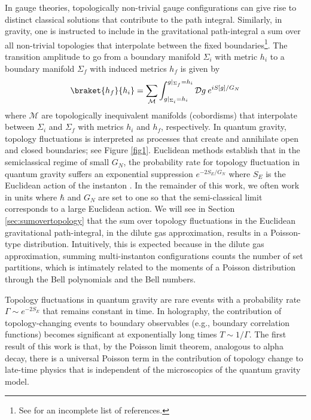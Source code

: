 \documentclass[a4paper,11pt]{article}
\theoremstyle{definition}
\numberwithin{equation}{section}
\newcommand{\NL}[1]{\textcolor{blue}{#1}}
\newcommand{\mM}{\mathcal{M}}
\begin{document}

In gauge theories, topologically non-trivial gauge configurations can give rise to distinct classical solutions that contribute to the path integral. 
Similarly, in gravity, one is instructed to include in the gravitational path-integral a sum over all non-trivial topologies that interpolate between the fixed boundaries\footnote{See \cite{hawking1980quantum,hawking1982unpredictability,hartle1983wave,strominger1984vacuum,hawking1987quantum,hawking1988wormholes} for an incomplete list of references.}. The transition amplitude to go from a boundary manifold $\Sigma_i$ with metric $h_i$ to a boundary manifold $\Sigma_f$ with induced metrics $h_f$ is given by 
\begin{eqnarray}
    \braket{h_f}{h_i}=\sum_{\mathcal{M}}\int_{g|_{\Sigma_i}=h_i}^{g|_{\Sigma_f}=h_i} \mathcal{D}g\:e^{i S[g]/G_N}
\end{eqnarray}
where $\mM$ are topologically inequivalent manifolds (cobordisms) that interpolate between $\Sigma_i$ and $\Sigma_f$ with metrics $h_i$ and $h_f$, respectively. In quantum gravity, topology fluctuations is interpreted as processes that create and annihilate open and closed boundaries; see Figure \ref{fig1}. Euclidean methods establish that in the semiclassical regime of small $G_N$, the probability rate for topology fluctuation in quantum gravity suffers an exponential suppression $e^{-2S_E/G_N}$ where $S_E$ is the Euclidean action of the instanton \cite{gross1982instability}. In the remainder of this work, we often work in units where $\hbar$ and $G_N$ are set to one so that the semi-classical limit corresponds to a large Euclidean action. We will see in Section \ref{sec:sumovertopology} that the sum over topology fluctuations in the Euclidean gravitational path-integral, in the dilute gas approximation, results in a Poisson-type distribution. Intuitively, this is expected because in the dilute gas approximation, summing multi-instanton configurations counts the number of set partitions, which is intimately related to the moments of a Poisson distribution through the Bell polynomials and the Bell numbers.

Topology fluctuations in quantum gravity are rare events with a probability rate $\Gamma\sim e^{-2S_E}$ that remains constant in time. In holography, the contribution of topology-changing events to boundary observables (e.g., boundary correlation functions) becomes significant at exponentially long times $T\sim 1/\Gamma$. 
The first result of this work is that, by the Poisson limit theorem, analogous to alpha decay, there is a universal Poisson term in the contribution of topology change to late-time physics that is independent of the microscopics of the quantum gravity model. 
\end{document}
